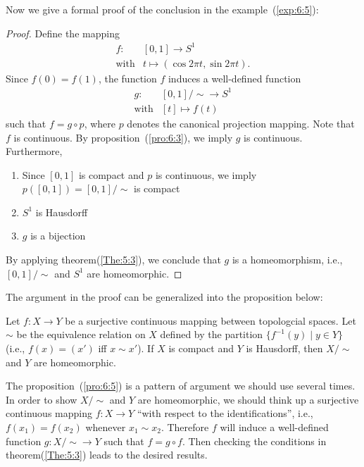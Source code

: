 Now we give a formal proof of the conclusion in the example~(\ref{exp:6:5}):
\begin{proof}
Define the mapping
\[
\begin{array}{ll}
f:&[0,1]\to S^1\\
\text{with}&t\mapsto(\cos2\pi t,\sin 2\pi t).
\end{array}
\]
Since $f(0)=f(1)$, the function $f$ induces a well-defined function
\[
\begin{array}{ll}
g:&[0,1]/\sim\to S^1\\
\text{with}&[t]\mapsto f(t)
\end{array}
\]
such that $f=g\circ p$, where $p$ denotes the canonical projection mapping.
Note that $f$ is continuous.
By proposition~(\ref{pro:6:3}), we imply $g$ is continuous.
Furthermore,
\begin{enumerate}
\item
Since $[0,1]$ is compact and $p$ is continuous, we imply $p([0,1])=[0,1]/\sim$ is compact
\item
$S^1$ is Hausdorff
\item
$g$ is a bijection
\end{enumerate}
By applying theorem(\ref{The:5:3}), we conclude that $g$ is a homeomorphism, i.e., $[0,1]/\sim$ and $S^1$ are homeomorphic.

\end{proof}
The argument in the proof can be generalized into the proposition below:
\begin{proposition}\label{pro:6:5}
Let $f:X\to Y$ be a surjective continuous mapping between topologcial spaces.
Let $\sim$ be the equivalence relation on $X$ defined by the partition $\{f^{-1}(y)\mid y\in Y\}$ (i.e., $f(x)=(x')$ iff $x\sim x'$).
If $X$ is compact and $Y$ is Hausdorff, then $X/\sim$ and $Y$ are homeomorphic.
\end{proposition}
\begin{remark}
The proposition~(\ref{pro:6:5}) is a pattern of argument we should use several times.
In order to show $X/\sim$ and $Y$ are homeomorphic, we should think up a surjective continuous mapping $f:X\to Y$ ``with respect to the identifications'', i.e., $f(x_1)= f(x_2)$ whenever $x_1\sim x_2$.
Therefore $f$ will induce a well-defined function $g:X/\sim\to Y$ such that $f = g\circ f$.
Then checking the conditions in theorem(\ref{The:5:3}) leads to the desired results.
\end{remark}

